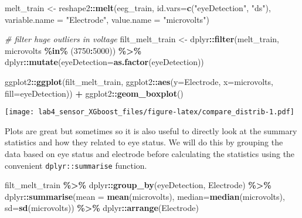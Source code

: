 \documentclass[
]{article}
\newenvironment{Shaded}{\begin{snugshade}}{\end{snugshade}}
\newcommand{\AttributeTok}[1]{\textcolor[rgb]{0.13,0.29,0.53}{#1}}
\newcommand{\CommentTok}[1]{\textcolor[rgb]{0.56,0.35,0.01}{\textit{#1}}}
\newcommand{\DecValTok}[1]{\textcolor[rgb]{0.00,0.00,0.81}{#1}}
\newcommand{\FunctionTok}[1]{\textcolor[rgb]{0.13,0.29,0.53}{\textbf{#1}}}
\newcommand{\NormalTok}[1]{#1}
\newcommand{\OtherTok}[1]{\textcolor[rgb]{0.56,0.35,0.01}{#1}}
\newcommand{\SpecialCharTok}[1]{\textcolor[rgb]{0.81,0.36,0.00}{\textbf{#1}}}
\newcommand{\StringTok}[1]{\textcolor[rgb]{0.31,0.60,0.02}{#1}}
\begin{document}
\begin{Shaded}
\begin{Highlighting}[]
\NormalTok{melt\_train }\OtherTok{\textless{}{-}}\NormalTok{ reshape2}\SpecialCharTok{::}\FunctionTok{melt}\NormalTok{(eeg\_train, }\AttributeTok{id.vars=}\FunctionTok{c}\NormalTok{(}\StringTok{"eyeDetection"}\NormalTok{, }\StringTok{"ds"}\NormalTok{), }\AttributeTok{variable.name =} \StringTok{"Electrode"}\NormalTok{, }\AttributeTok{value.name =} \StringTok{"microvolts"}\NormalTok{)}

\CommentTok{\# filter huge outliers in voltage}
\NormalTok{filt\_melt\_train }\OtherTok{\textless{}{-}}\NormalTok{ dplyr}\SpecialCharTok{::}\FunctionTok{filter}\NormalTok{(melt\_train, microvolts }\SpecialCharTok{\%in\%}\NormalTok{ (}\DecValTok{3750}\SpecialCharTok{:}\DecValTok{5000}\NormalTok{)) }\SpecialCharTok{\%\textgreater{}\%}\NormalTok{ dplyr}\SpecialCharTok{::}\FunctionTok{mutate}\NormalTok{(}\AttributeTok{eyeDetection=}\FunctionTok{as.factor}\NormalTok{(eyeDetection))}

\NormalTok{ggplot2}\SpecialCharTok{::}\FunctionTok{ggplot}\NormalTok{(filt\_melt\_train, ggplot2}\SpecialCharTok{::}\FunctionTok{aes}\NormalTok{(}\AttributeTok{y=}\NormalTok{Electrode, }\AttributeTok{x=}\NormalTok{microvolts, }\AttributeTok{fill=}\NormalTok{eyeDetection)) }\SpecialCharTok{+}\NormalTok{ ggplot2}\SpecialCharTok{::}\FunctionTok{geom\_boxplot}\NormalTok{()}
\end{Highlighting}
\end{Shaded}

\texttt{[image: lab4\_sensor\_XGboost\_files/figure-latex/compare\_distrib-1.pdf]}

Plots are great but sometimes so it is also useful to directly look at
the summary statistics and how they related to eye status. We will do
this by grouping the data based on eye status and electrode before
calculating the statistics using the convenient
\texttt{dplyr::summarise} function.

\begin{Shaded}
\begin{Highlighting}[]
\NormalTok{filt\_melt\_train }\SpecialCharTok{\%\textgreater{}\%}\NormalTok{ dplyr}\SpecialCharTok{::}\FunctionTok{group\_by}\NormalTok{(eyeDetection, Electrode) }\SpecialCharTok{\%\textgreater{}\%} 
\NormalTok{    dplyr}\SpecialCharTok{::}\FunctionTok{summarise}\NormalTok{(}\AttributeTok{mean =} \FunctionTok{mean}\NormalTok{(microvolts), }\AttributeTok{median=}\FunctionTok{median}\NormalTok{(microvolts), }\AttributeTok{sd=}\FunctionTok{sd}\NormalTok{(microvolts)) }\SpecialCharTok{\%\textgreater{}\%} 
\NormalTok{    dplyr}\SpecialCharTok{::}\FunctionTok{arrange}\NormalTok{(Electrode)}
\end{Highlighting}
\end{Shaded}
\end{document}

